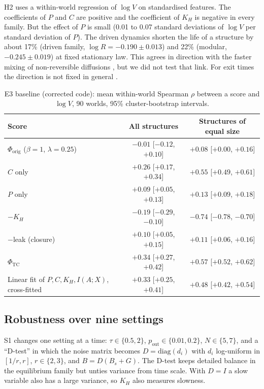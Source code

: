 \documentclass[11pt]{article}
\newcommand{\Phiorig}{\Phi_{\mathrm{orig}}}
\newcommand{\PhiTC}{\Phi_{\mathrm{TC}}}
\newcommand{\pout}{p_{\mathrm{out}}}
\begin{document}
H2 uses a within-world regression of $\log V$ on standardised features. The coefficients of $P$ and $C$ are
positive and the coefficient of $K_H$ is negative in every family. But the effect of $P$ is small (0.01 to 0.07 standard
deviations of $\log V$ per standard deviation of $P$). The driven dynamics shorten the life of a structure by about 17\%
(driven family, $\log R = -0.190 \pm 0.013$) and 22\% (modular, $-0.245\pm0.019$) at fixed stationary law. This agrees
in direction with the faster mixing of non-reversible diffusions \cite{HwangHwangMaSheu93,LelievreNierPavliotis13},
but we did not test that link. For exit times the direction is not fixed in general \cite{LePeutrecMichelNectoux23}.

\begin{table}[t]
\centering
\small
\caption{E3 baseline (corrected code): mean within-world Spearman $\rho$ between a score and $\log V$, 90 worlds,
95\% cluster-bootstrap intervals.}
\label{tab:e3}
\begin{tabular}{@{}lcc@{}}
\toprule
Score & All structures & Structures of equal size \\
\midrule
$\Phiorig$ ($\beta=1$, $\lambda=0.25$) & $-0.01$ [$-0.12$, $+0.10$] & $+0.08$ [$+0.00$, $+0.16$] \\
$C$ only & $+0.26$ [$+0.17$, $+0.34$] & $+0.55$ [$+0.49$, $+0.61$] \\
$P$ only & $+0.09$ [$+0.05$, $+0.13$] & $+0.13$ [$+0.09$, $+0.18$] \\
$-K_H$ & $-0.19$ [$-0.29$, $-0.10$] & $-0.74$ [$-0.78$, $-0.70$] \\
$-$leak (closure) & $+0.10$ [$+0.05$, $+0.15$] & $+0.11$ [$+0.06$, $+0.16$] \\
$\PhiTC$ & $+0.34$ [$+0.27$, $+0.42$] & $+0.57$ [$+0.52$, $+0.62$] \\
Linear fit of $P, C, K_H, I(A;X)$, cross-fitted & $+0.33$ [$+0.25$, $+0.41$] & $+0.48$ [$+0.42$, $+0.54$] \\
\bottomrule
\end{tabular}
\end{table}

\subsection{Robustness over nine settings}
S1 changes one setting at a time: $\tau \in \{0.5, 2\}$, $\pout \in \{0.01, 0.2\}$, $N\in\{5,7\}$, and a ``D-test''
in which the noise matrix becomes $D=\mathrm{diag}(d_i)$ with $d_i$ log-uniform in $[1/r, r]$, $r\in\{2,3\}$, and
$B = D(B_s + G)$. The D-test keeps detailed balance in the equilibrium family but unties variance from time scale. With $D=I$ a slow
variable also has a large variance, so $K_H$ also measures slowness.
\end{document}
